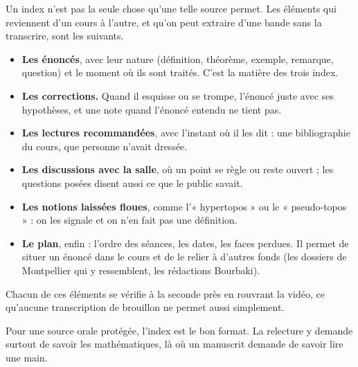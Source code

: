 Un index n'est pas la seule chose qu'une telle source permet. Les éléments qui reviennent
d'un cours à l'autre, et qu'on peut extraire d'une bande sans la transcrire, sont les
suivants.
\begin{itemize}
  \item \textbf{Les énoncés}, avec leur nature (définition, théorème, exemple, remarque,
        question) et le moment où ils sont traités. C'est la matière des trois index.
  \item \textbf{Les corrections.} Quand il esquisse ou se trompe, l'énoncé juste avec ses
        hypothèses, et une note quand l'énoncé entendu ne tient pas.
  \item \textbf{Les lectures recommandées}, avec l'instant où il les dit : une bibliographie
        du cours, que personne n'avait dressée.
  \item \textbf{Les discussions avec la salle}, où un point se règle ou reste ouvert ; les
        questions posées disent aussi ce que le public savait.
  \item \textbf{Les notions laissées floues}, comme l'« hypertopos » ou le « pseudo-topos » :
        on les signale et on n'en fait pas une définition.
  \item \textbf{Le plan}, enfin : l'ordre des séances, les dates, les faces perdues. Il
        permet de situer un énoncé dans le cours et de le relier à d'autres fonds (les
        dossiers de Montpellier qui y ressemblent, les rédactions Bourbaki).
\end{itemize}
Chacun de ces éléments se vérifie à la seconde près en rouvrant la vidéo, ce qu'aucune
transcription de brouillon ne permet aussi simplement.

\begin{exemple}
Pour une source orale protégée, l'index est le bon format. La relecture y demande surtout
de savoir les mathématiques, là où un manuscrit demande de savoir lire une main.
\end{exemple}
